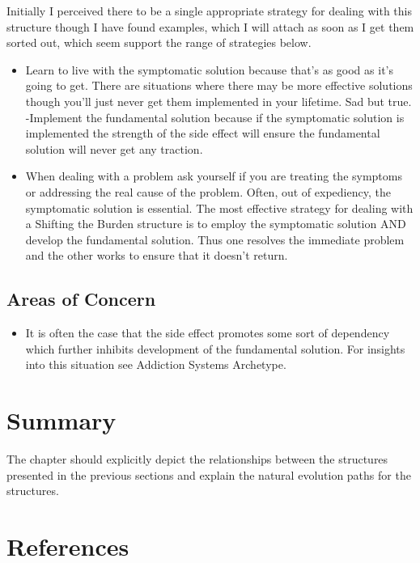 \documentclass[]{memoir}
\begin{document}
Initially I perceived there to be a single appropriate strategy for
dealing with this structure though I have found examples, which I will
attach as soon as I get them sorted out, which seem support the range of
strategies below.

\begin{itemize}
\itemsep1pt\parskip0pt
\item
  Learn to live with the symptomatic solution because that's as good as
  it's going to get. There are situations where there may be more
  effective solutions though you'll just never get them implemented in
  your lifetime. Sad but true. -Implement the fundamental solution
  because if the symptomatic solution is implemented the strength of the
  side effect will ensure the fundamental solution will never get any
  traction.
\item
  When dealing with a problem ask yourself if you are treating the
  symptoms or addressing the real cause of the problem. Often, out of
  expediency, the symptomatic solution is essential. The most effective
  strategy for dealing with a Shifting the Burden structure is to employ
  the symptomatic solution AND develop the fundamental solution. Thus
  one resolves the immediate problem and the other works to ensure that
  it doesn't return.
\end{itemize}

\subsection{Areas of Concern}

\begin{itemize}
\itemsep1pt\parskip0pt
\item
  It is often the case that the side effect promotes some sort of
  dependency which further inhibits development of the fundamental
  solution. For insights into this situation see Addiction Systems
  Archetype.
\end{itemize}

\section{Summary}

The chapter should explicitly depict the relationships between the
structures presented in the previous sections and explain the natural
evolution paths for the structures.

\section{References}
\end{document}
